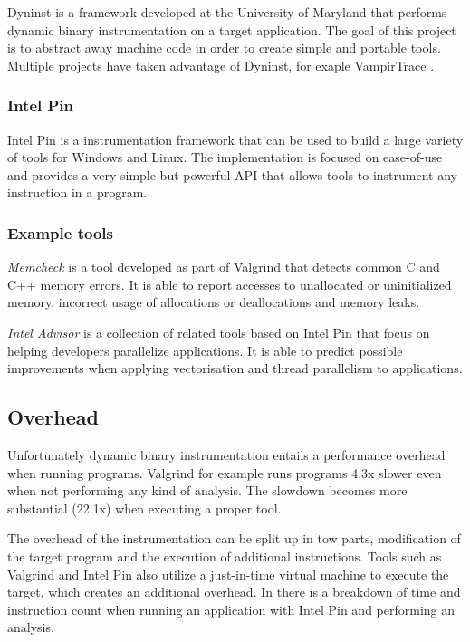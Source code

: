Dyninst \cite{dyninst} is a framework developed at the University of Maryland that performs dynamic binary instrumentation on a target application. The goal of this project is to abstract away machine code in order to create simple and portable tools. Multiple projects have taken advantage of Dyninst, for exaple VampirTrace \cite{vampirtrace}.

\subsubsection{Intel Pin}

Intel Pin \cite{pin} is a instrumentation framework that can be used to build a large variety of tools for Windows and Linux. The implementation is focused on ease-of-use and provides a very simple but powerful API that allows tools to instrument any instruction in a program.

\subsubsection{Example tools}

\emph{Memcheck} \cite{memcheck} is a tool developed as part of Valgrind that detects common C and C++ memory errors. It is able to report accesses to unallocated or uninitialized memory, incorrect usage of allocations or deallocations and memory leaks.

\emph{Intel Advisor} \cite{inteladvisor} is a collection of related tools based on Intel Pin that focus on helping developers parallelize applications. It is able to predict possible improvements when applying vectorisation and thread parallelism to applications.

\subsection{Overhead}

Unfortunately dynamic binary instrumentation entails a performance overhead when running programs. Valgrind for example runs programs 4.3x slower \cite{valgrind} even when not performing any kind of analysis. The slowdown becomes more substantial (22.1x) when executing a proper tool.

The overhead of the instrumentation can be split up in tow parts, modification of the target program and the execution of additional instructions. Tools such as Valgrind and Intel Pin also utilize a just-in-time virtual machine to execute the target, which creates an additional overhead. In \cite{instoverhead} there is a breakdown of time and instruction count when running an application with Intel Pin and performing an analysis.

